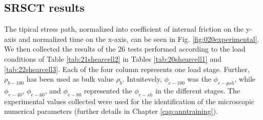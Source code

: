 \subsection{SRSCT results}
\label{subsec:srsctresults}

The tipical stress path, normalized into coefficient of internal friction on the
y-axis and normalized time on the x-axis, can be seen in Fig.
\ref{fig:020experimental}.\\
We then collected the results of the 26 tests performed according to the load
conditions of Table \ref{tab:21shearcell2} in Tables \ref{tab:20shearcell1}
and \ref{tab:22shearcell3}.
Each of the four column represents one load stage.
Further, $\rho_{b-100}$ has been used as bulk value $\rho_{b}$.
Intuitevely, $\phi_{e-100}$ was the $\phi_{e-psh}$, while $\phi_{e-40}$,
$\phi_{e-60}$, and $\phi_{e-80}$ represented the $\phi_{e-sh}$ in the different
stages.
The experimental values collected were used for the identification of the
microscopic numerical parameters (further details in Chapter
\ref{cap:anntraining}).

% 



